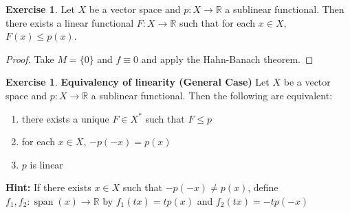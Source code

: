 \documentclass[12pt]{amsart}
\theoremstyle{definition}
\newtheorem{ex}[definition]{Exercise}
\newcommand{\R}{\mathbb{R}}
\newcommand{\tbf}[1]{\textbf{#1}}
\DeclareMathOperator{\spn}{span}
\DeclareMathOperator*{\0}{\mbf{0}}
\DeclareMathOperator*{\1}{\mbf{1}}
\newcommand{\lex}[1]{\label{ex:#1}}
\begin{document}
	\begin{ex} \lex{55011}
		Let $X$ be a vector space and $p:X \rightarrow \R$ a sublinear functional. Then there exists a linear functional $F: X \rightarrow \R$ such that for each $x \in X$, $F(x) \leq p(x)$.
	\end{ex}
	
	\begin{proof}
		Take $M = \{0\}$ and $f \equiv 0$ and apply the Hahn-Banach theorem.
	\end{proof}	
	
	\begin{ex} \lex{55012} \tbf{Equivalency of linearity (General Case)}
		Let $X$ be a vector space and $p:X \rightarrow \R$ a sublinear functional. Then the following are equivalent:
		\begin{enumerate}
			\item there exists a unique $F \in X^*$ such that $F \leq p$
			\item for each $x \in X$, $-p(-x) = p(x)$
			\item $p$ is linear
		\end{enumerate}	
		\tbf{Hint:} If there exists $x \in X$ such that $-p(-x) \neq p(x)$, define $f_1,f_2 :\spn(x) \rightarrow \R$ by $f_1(tx) = t p(x)$ and $f_2(tx) = -tp(-x)$
	\end{ex}	
	
\end{document}
